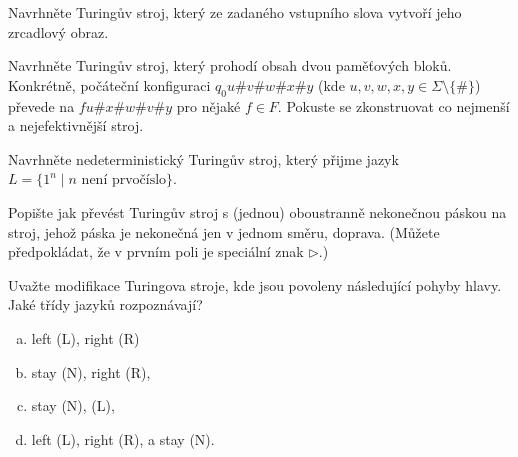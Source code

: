 \documentclass[a4paper,12pt]{amsart}
\begin{document}
\medskip\begin{problem}[Zrcadlení]
    
    Navrhněte Turingův stroj, který ze zadaného vstupního slova vytvoří jeho zrcadlový obraz.

\end{problem}


\medskip\begin{problem}

    Navrhněte Turingův stroj, který prohodí obsah dvou paměťových bloků. Konkrétně, počáteční konfiguraci $q_0u\#v\#w\#x\#y$ (kde $u, v, w, x, y \in \Sigma\setminus\{\#\}$) převede na $fu\#x\#w\#v\#y$ pro nějaké $f\in F$. Pokuste se zkonstruovat co nejmenší a nejefektivnější stroj.

\end{problem}
    

\medskip\begin{problem}
    
    Navrhněte nedeterministický Turingův stroj, který přijme jazyk $L=\{1^n \mid\text{$n$ není prvočíslo}\}$.

\end{problem}


\begin{problem}

    Popište jak převést Turingův stroj s (jednou) oboustranně nekonečnou páskou na stroj, jehož páska je nekonečná jen v jednom směru, doprava. (Můžete předpokládat, že v prvním poli je speciální znak $\triangleright$.)

\end{problem}
    

\begin{problem}
    
    Uvažte modifikace Turingova stroje, kde jsou povoleny následující pohyby hlavy. Jaké třídy jazyků rozpoznávají?
    \begin{multicols}{2}
        \begin{enumerate}[(a)]
            \item left (L), right (R)
            \item stay (N), right (R),
            \item stay (N), (L),
            \item left (L), right (R), a stay (N).
        \end{enumerate}    
    \end{multicols}

\end{problem}
\end{document}
